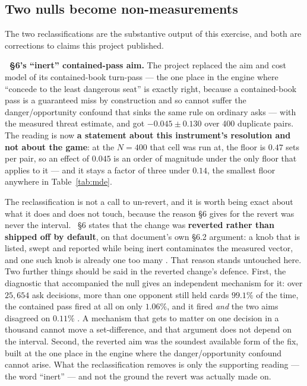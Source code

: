 \documentclass[11pt]{article}
\begin{document}
\subsection{Two nulls become non-measurements}

The two reclassifications are the substantive output of this exercise, and both are corrections to
claims this project published.

\textbf{\cite{concession}~\S6's ``inert'' contained-pass aim.} The project replaced the aim and cost
model of its contained-book turn-pass --- the one place in the engine where ``concede to the least
dangerous seat'' is exactly right, because a contained-book pass is a guaranteed miss by
construction and so cannot suffer the danger/opportunity confound that sinks the same rule on
ordinary asks --- with the measured threat estimate, and got $-0.045 \pm 0.130$ over 400 duplicate
pairs. The reading is now \textbf{a statement about this instrument's resolution and not about the
game}: at the $N=400$ that cell was run at, the floor is $0.47$ sets per pair, so an effect of
$0.045$ is an order of magnitude under the only floor that applies to it --- and it stays a factor of
three under $0.14$, the smallest floor anywhere in Table~\ref{tab:mde}.

The reclassification is not a call to un-revert, and it is worth being exact about what it does and
does not touch, because the reason \S6 gives for the revert was never the interval.
\cite{concession}~\S6 states that the change was \textbf{reverted rather than shipped off by
default}, on that document's own \S6.2 argument: a knob that is listed, swept and reported while
being inert contaminates the measured vector, and one such knob is already one too many
\cite{inertaxis}. That reason stands untouched here. Two further things should be said in the
reverted change's defence. First, the diagnostic that accompanied the null gives an independent
mechanism for it: over $25{,}654$ ask decisions, more than one opponent still held cards $99.1\%$ of
the time, the contained pass fired at all on only $1.06\%$, and it fired \emph{and} the two aims
disagreed on $0.11\%$ \cite{concession}. A mechanism that gets to matter on one decision in a
thousand cannot move a set-difference, and that argument does not depend on the interval. Second,
the reverted aim was the soundest available form of the fix, built at the one place in the engine
where the danger/opportunity confound cannot arise. What the reclassification removes is only the
supporting reading --- the word ``inert'' --- and not the ground the revert was actually made on.
\end{document}
